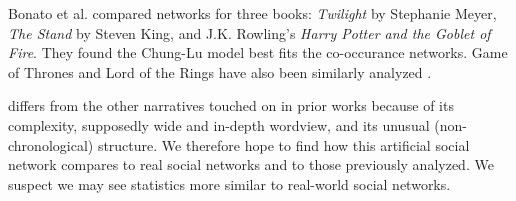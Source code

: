 Bonato et al. \cite{Bonato2016} compared networks for three books: {\em Twilight} by Stephanie Meyer, {\em The Stand} by Steven King, and J.K. Rowling's {\em Harry Potter and the Goblet of Fire}. 
They found the Chung-Lu model best fits the co-occurance networks.
Game of Thrones and Lord of the Rings have also been similarly analyzed \cite{GOT,ribeiro2016complex}.


\infinitejest differs from the other narratives touched on in prior works because of its complexity, supposedly wide and in-depth wordview, and its unusual (non-chronological) structure. We therefore hope to find how this artificial social network compares to real social networks and to those previously analyzed. We suspect we may see statistics more similar to real-world social networks.

